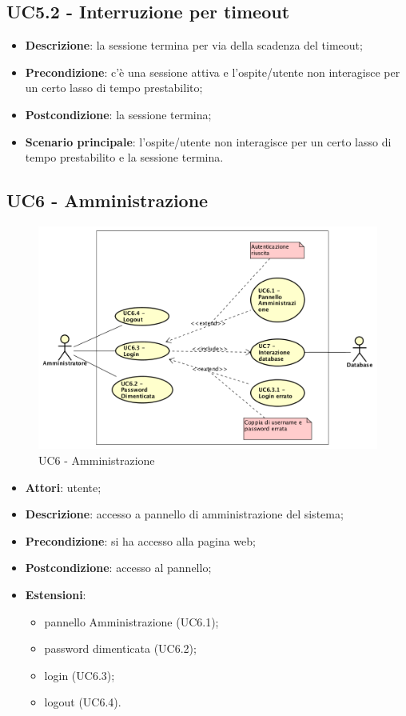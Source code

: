 \documentclass[../AnalisiDeiRequisiti.tex]{subfiles}
\begin{document}
\subsection{UC5.2 - Interruzione per timeout} 
\label{sssec:UC5.2} 
\begin{itemize} 
\item \textbf{Descrizione}: la sessione termina per via della scadenza del timeout;
\item \textbf{Precondizione}: c'è una sessione attiva e l'ospite/utente non interagisce per un certo lasso di tempo prestabilito;
\item \textbf{Postcondizione}: la sessione termina;
\item \textbf{Scenario principale}: l'ospite/utente non interagisce per un certo lasso di tempo prestabilito e la sessione termina.\end{itemize} 

\newpage
\subsection{UC6 - Amministrazione} 
\begin{figure}[!h]
	\centering
	\includegraphics[width=\textwidth]{UseCases/UC6-Amministrazione/Immagini/UCPannelloAmministrazione.png}
	\caption{UC6 - Amministrazione}
\end{figure}	
\label{sssec:UC6} 
\begin{itemize} 
\item \textbf{Attori}: utente;
\item \textbf{Descrizione}: accesso a pannello di amministrazione del sistema;
\item \textbf{Precondizione}: si ha accesso alla pagina web;
\item \textbf{Postcondizione}: accesso al pannello;
\item \textbf{Estensioni}:\begin{itemize}\item pannello Amministrazione (UC6.1);\item password dimenticata (UC6.2);\item login (UC6.3);\item logout (UC6.4).\end{itemize}
\end{itemize}
\newpage
\end{document}

